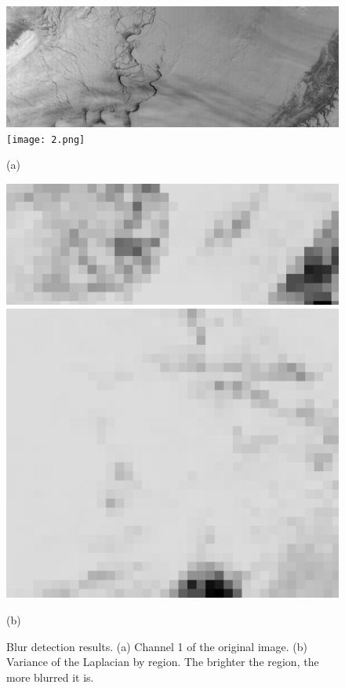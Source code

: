 \documentclass{article}
\begin{document}
        \begin{figure}[h]
            \centering
            \begin{minipage}{0.49\hsize}
                \centering
                \includegraphics[width = 1\hsize]{1.png}
                \texttt{[image: 2.png]}
                \caption*{(a)}
            \end{minipage}
            \begin{minipage}{0.49\hsize}
                \centering
                \includegraphics[width = 1\hsize]{1_blur.png}
                \includegraphics[width = 1\hsize]{2_blur.png}
                \caption*{(b)}
            \end{minipage}
            \caption{
                Blur detection results.
                (a) Channel 1 of the original image.
                (b) Variance of the Laplacian by region.
                The brighter the region, the more blurred it is.
            }
            \label{fig:blur}
        \end{figure}
\end{document}
